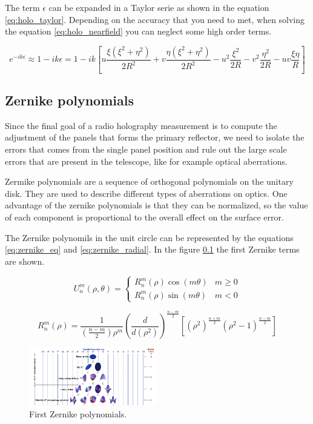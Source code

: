 The term $\epsilon$ can be expanded in a Taylor serie as shown in the equation \ref{eq:holo_taylor}. Depending on the accuracy that you need to met, when solving the equation \ref{eq:holo_nearfield} you can neglect some high order terms.

\begin{equation}
    e^{-ik\epsilon} \approx 1-ik\epsilon = 1-ik\left[ u \frac{\xi(\xi^2+\eta^2)}{2R^2} + v \frac{\eta(\xi^2
+\eta^2)}{2R^2}-u^2\frac{\xi^2}{2R}-v^2\frac{\eta^2}{2R}-uv\frac{\xi\eta}{R} \right]
    \label{eq:holo_taylor}
\end{equation}



\subsection{Zernike polynomials}
Since the final goal of a radio holography measurement is to compute the adjustment of the panels that forms the primary reflector, we need to isolate the errors that comes from the single panel position and rule out the large scale errors that are present in the telescope, like for example optical aberrations. 


Zermike polynomials are a sequence of orthogonal polynomials on the unitary disk. They are used to describe different types of aberrations on optics. 
One advantage of the zernike polynomials is that they can be normalized, so the value of each component is proportional to the overall effect on the surface error.



The Zernike polynomils in the unit circle can be represented by the equations \ref{eq:zernike_eq} and \ref{eq:zernike_radial}. In the figure \ref{} the first Zernike terms are shown.


\begin{equation}
    U_{n}^{m}(\rho, \theta) = \begin{cases}
        R_{n}^{m}(\rho)\cos(m \theta) & m \ge 0 \\
        R_{n}^{m}(\rho)\sin(m \theta) & m < 0
    \end{cases}
    \label{eq:zernike_eq}
\end{equation}

\begin{equation}
    R_{n}^{m}(\rho) = \frac{1}{\left(\frac{n-m}{2} \right) \rho^m} \left( \frac{d}{d(\rho^2)} \right)^{\frac{n-m}{2}} \left[ \left(\rho^2 \right)^{\frac{n+m}{2}} \left( \rho^2-1 \right)^{\frac{n-m}{2}} \right]
    \label{eq:zernike_radial}
\end{equation}



\begin{figure}
    \centering
    \includegraphics[width=0.5\textwidth]{images/zernike_pols.png}
    \caption{First Zernike polynomials.}
    \label{fig:zernike_pols}
\end{figure}











